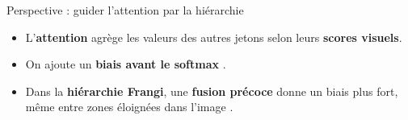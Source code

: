 \begin{frame}[t]{Perspective : guider l'attention par la hiérarchie}
    \vspace{0.02cm}
    \begin{center}
        \resizebox{0.64\textwidth}{!}{}
    \end{center}

    \vspace{0.06cm}
    \small
    \begin{itemize}
        \setlength{\itemsep}{3pt}
        \item L'\textbf{attention} agrège les valeurs des autres jetons selon leurs
        \textbf{scores visuels}.
        \item On ajoute un \textbf{biais avant le softmax} .
        \item Dans la \textbf{hiérarchie Frangi}, une \textbf{fusion précoce} donne un biais
        plus fort, même entre zones éloignées dans l'image .
    \end{itemize}

    \vspace{0.06cm}
    \begin{center}
    \end{center}
\end{frame}
